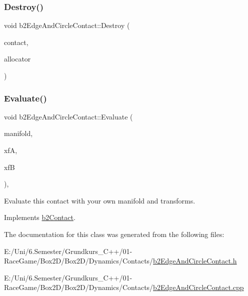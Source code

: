 \mbox{\label{classb2_edge_and_circle_contact_a123eeb8144b01fc15c1318eacd0da4ca}} 
\subsubsection{\texorpdfstring{Destroy()}{Destroy()}}
{\footnotesize\ttfamily void b2\+Edge\+And\+Circle\+Contact\+::\+Destroy (\begin{DoxyParamCaption}\item[{\mbox{\hyperlink{classb2_contact}{b2\+Contact}} $\ast$}]{contact,  }\item[{\mbox{\hyperlink{classb2_block_allocator}{b2\+Block\+Allocator}} $\ast$}]{allocator }\end{DoxyParamCaption})\hspace{0.3cm}{\ttfamily [static]}}

\mbox{\label{classb2_edge_and_circle_contact_aec021f688dcf2b5a2c483edde476d4b6}} 
\subsubsection{\texorpdfstring{Evaluate()}{Evaluate()}}
{\footnotesize\ttfamily void b2\+Edge\+And\+Circle\+Contact\+::\+Evaluate (\begin{DoxyParamCaption}\item[{\mbox{\hyperlink{structb2_manifold}{b2\+Manifold}} $\ast$}]{manifold,  }\item[{const \mbox{\hyperlink{structb2_transform}{b2\+Transform}} \&}]{xfA,  }\item[{const \mbox{\hyperlink{structb2_transform}{b2\+Transform}} \&}]{xfB }\end{DoxyParamCaption})\hspace{0.3cm}{\ttfamily [override]}, {\ttfamily [virtual]}}



Evaluate this contact with your own manifold and transforms. 



Implements \mbox{\hyperlink{classb2_contact_ae3c2842e5325b2d4500f8ed1d4de2f72}{b2\+Contact}}.



The documentation for this class was generated from the following files\+:\begin{DoxyCompactItemize}
\item 
E\+:/\+Uni/6.\+Semester/\+Grundkurs\+\_\+\+C++/01-\/\+Race\+Game/\+Box2\+D/\+Box2\+D/\+Dynamics/\+Contacts/\mbox{\hyperlink{b2_edge_and_circle_contact_8h}{b2\+Edge\+And\+Circle\+Contact.\+h}}\item 
E\+:/\+Uni/6.\+Semester/\+Grundkurs\+\_\+\+C++/01-\/\+Race\+Game/\+Box2\+D/\+Box2\+D/\+Dynamics/\+Contacts/\mbox{\hyperlink{b2_edge_and_circle_contact_8cpp}{b2\+Edge\+And\+Circle\+Contact.\+cpp}}\end{DoxyCompactItemize}

